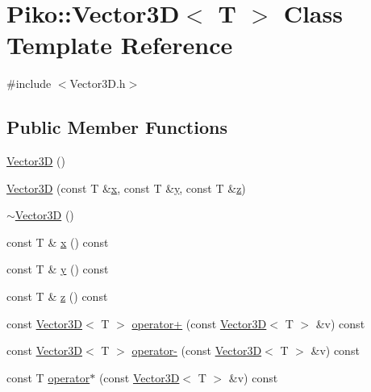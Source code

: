 \hypertarget{class_piko_1_1_vector3_d}{\section{Piko\-:\-:Vector3\-D$<$ T $>$ Class Template Reference}
\label{d1/db7/class_piko_1_1_vector3_d}
}


{\ttfamily \#include $<$Vector3\-D.\-h$>$}

\subsection*{Public Member Functions}
\begin{DoxyCompactItemize}
\item 
\hyperlink{class_piko_1_1_vector3_d_a6c029b1bb12d366cc786fd6d0f604d2b}{Vector3\-D} ()
\item 
\hyperlink{class_piko_1_1_vector3_d_a66285812755943b85960ee18c9ffca85}{Vector3\-D} (const T \&\hyperlink{class_piko_1_1_vector3_d_abb96dedfc12a40f512eb2e2dd661101f}{x}, const T \&\hyperlink{class_piko_1_1_vector3_d_a417b3ceda79a9e1b31973a9c4cb5c14a}{y}, const T \&\hyperlink{class_piko_1_1_vector3_d_a0562caf62dbc2ca47c740335b56be3a8}{z})
\item 
\hyperlink{class_piko_1_1_vector3_d_afd382085d038303d784b0f45e2f7905c}{$\sim$\-Vector3\-D} ()
\item 
const T \& \hyperlink{class_piko_1_1_vector3_d_abb96dedfc12a40f512eb2e2dd661101f}{x} () const 
\item 
const T \& \hyperlink{class_piko_1_1_vector3_d_a417b3ceda79a9e1b31973a9c4cb5c14a}{y} () const 
\item 
const T \& \hyperlink{class_piko_1_1_vector3_d_a0562caf62dbc2ca47c740335b56be3a8}{z} () const 
\item 
const \hyperlink{class_piko_1_1_vector3_d}{Vector3\-D}$<$ T $>$ \hyperlink{class_piko_1_1_vector3_d_afb00dc485366b07943e8758a8e03bf5f}{operator+} (const \hyperlink{class_piko_1_1_vector3_d}{Vector3\-D}$<$ T $>$ \&v) const 
\item 
const \hyperlink{class_piko_1_1_vector3_d}{Vector3\-D}$<$ T $>$ \hyperlink{class_piko_1_1_vector3_d_af35d2328bf88f40b9d0867d6e037d277}{operator-\/} (const \hyperlink{class_piko_1_1_vector3_d}{Vector3\-D}$<$ T $>$ \&v) const 
\item 
const T \hyperlink{class_piko_1_1_vector3_d_acbe0df428fa50081ebe02b76283ef98d}{operator$\ast$} (const \hyperlink{class_piko_1_1_vector3_d}{Vector3\-D}$<$ T $>$ \&v) const 

\end{DoxyCompactItemize}
